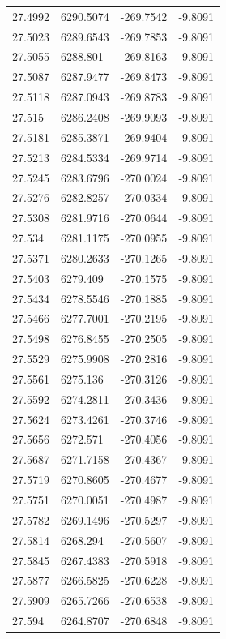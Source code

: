 \begin{table}[H]
\begin{tabular}{llll}
27.4992 & 6290.5074 & -269.7542 & -9.8091 \\
27.5023 & 6289.6543 & -269.7853 & -9.8091 \\
27.5055 & 6288.801 & -269.8163 & -9.8091 \\
27.5087 & 6287.9477 & -269.8473 & -9.8091 \\
27.5118 & 6287.0943 & -269.8783 & -9.8091 \\
27.515 & 6286.2408 & -269.9093 & -9.8091 \\
27.5181 & 6285.3871 & -269.9404 & -9.8091 \\
27.5213 & 6284.5334 & -269.9714 & -9.8091 \\
27.5245 & 6283.6796 & -270.0024 & -9.8091 \\
27.5276 & 6282.8257 & -270.0334 & -9.8091 \\
27.5308 & 6281.9716 & -270.0644 & -9.8091 \\
27.534 & 6281.1175 & -270.0955 & -9.8091 \\
27.5371 & 6280.2633 & -270.1265 & -9.8091 \\
27.5403 & 6279.409 & -270.1575 & -9.8091 \\
27.5434 & 6278.5546 & -270.1885 & -9.8091 \\
27.5466 & 6277.7001 & -270.2195 & -9.8091 \\
27.5498 & 6276.8455 & -270.2505 & -9.8091 \\
27.5529 & 6275.9908 & -270.2816 & -9.8091 \\
27.5561 & 6275.136 & -270.3126 & -9.8091 \\
27.5592 & 6274.2811 & -270.3436 & -9.8091 \\
27.5624 & 6273.4261 & -270.3746 & -9.8091 \\
27.5656 & 6272.571 & -270.4056 & -9.8091 \\
27.5687 & 6271.7158 & -270.4367 & -9.8091 \\
27.5719 & 6270.8605 & -270.4677 & -9.8091 \\
27.5751 & 6270.0051 & -270.4987 & -9.8091 \\
27.5782 & 6269.1496 & -270.5297 & -9.8091 \\
27.5814 & 6268.294 & -270.5607 & -9.8091 \\
27.5845 & 6267.4383 & -270.5918 & -9.8091 \\
27.5877 & 6266.5825 & -270.6228 & -9.8091 \\
27.5909 & 6265.7266 & -270.6538 & -9.8091 \\
27.594 & 6264.8707 & -270.6848 & -9.8091 \\

\end{tabular}
\end{table}
